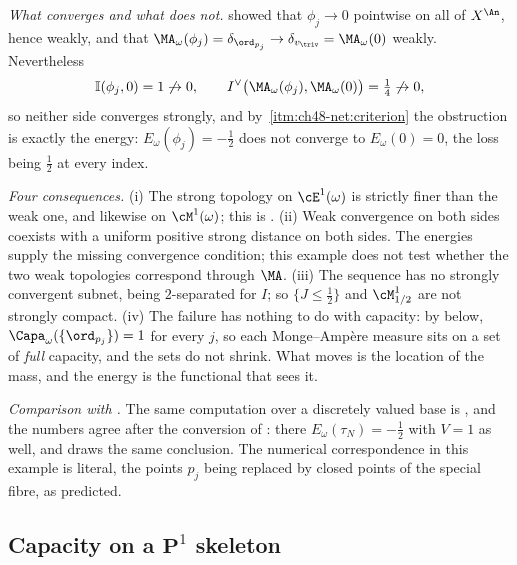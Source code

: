 \begin{example}
\emph{What converges and what does not.}
 showed that
$\phi_j\to0$ pointwise on all of $X^{\An}$, hence weakly, and that
$\MA_\omega(\phi_j)=\delta_{\ord_{p_j}}\to\delta_{v_{\triv}}
=\MA_\omega(0)$ weakly.  Nevertheless
\[
 \mathbb I(\phi_j,0)=1\not\to0,
 \qquad
 I^\vee\bigl(\MA_\omega(\phi_j),\MA_\omega(0)\bigr)=\tfrac14\not\to0,
\]
so neither side converges strongly, and by
\,\cref{itm:ch48-net:criterion} the obstruction
is exactly the energy: $E_\omega(\phi_j)=-\tfrac12$ does not converge to
$E_\omega(0)=0$, the loss being $\tfrac12$ at every index.

\emph{Four consequences.}  (i) The strong topology on $\cE^1(\omega)$ is
strictly finer than the weak one, and likewise on $\cM^1(\omega)$; this
is .  (ii) Weak convergence on both sides coexists with a uniform
positive strong distance on both sides. The energies supply the missing
convergence condition; this example does not test whether the two weak
topologies correspond through $\MA$.  (iii) The sequence has no strongly convergent subnet, being
$2$-separated for $I$; so $\{J\le\tfrac12\}$ and
$\cM^1_{1/2}$ are not strongly compact.  (iv) The failure has nothing to
do with capacity: by  below,
$\Capa_\omega(\{\ord_{p_j}\})=1$ for every $j$, so each
Monge--Amp\`ere measure sits on a set of \emph{full} capacity, and the
sets do not shrink.  What moves is the location of the mass, and the energy
is the functional that sees it.

\emph{Comparison with .}  The same computation over a
discretely valued base is , and the numbers agree
after the conversion of : there
$E_\omega(\tau_N)=-\tfrac12$ with $V=1$ as well, and
 draws the same conclusion.  The
numerical correspondence in this example is literal, the points $p_j$
being replaced by closed points of
the special fibre, as  predicted.
\end{example}

\subsection{Capacity on a \texorpdfstring{$\mathbf P^1$}{P1} skeleton}
\label{sec:ch48-ex-capacity}

